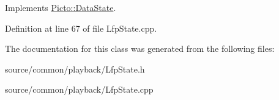 Implements \hyperlink{class_picto_1_1_data_state_a8338a5e0c034ccd190e2916e4d60a6e8}{Picto\-::\-Data\-State}.



Definition at line 67 of file Lfp\-State.\-cpp.



The documentation for this class was generated from the following files\-:\begin{DoxyCompactItemize}
\item 
source/common/playback/Lfp\-State.\-h\item 
source/common/playback/Lfp\-State.\-cpp\end{DoxyCompactItemize}
